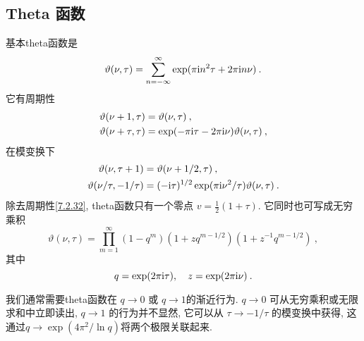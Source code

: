 \subsection*{Theta 函数}
基本theta函数是
\begin{equation}
	\vartheta(\nu, \tau)=\sum_{n=-\infty}^{\infty} \exp (\pi \mathrm{i} n^{2} \tau+2 \pi \mathrm{i} n \nu) \:. \label{7.2.31}
\end{equation}
它有周期性
\begin{subequations}  \label{7.2.32}
\begin{align}
\vartheta(\nu+1, \tau) &= \vartheta(\nu, \tau) \:, \label{7.2.32a}  \\
\vartheta(\nu+\tau, \tau) &= \exp (-\pi \mathrm{i} \tau-2 \pi \mathrm{i} \nu) \vartheta(\nu, \tau) \:, \label{7.2.32b} 
\end{align}
\end{subequations}
在模变换下
\begin{subequations} \label{7.2.33}
\begin{align}
\vartheta(\nu, \tau+1) &= \vartheta(\nu + 1/2, \tau) \:, \label{7.2.33a} \\
\vartheta(\nu/\tau, -1/\tau) &=(-\mathrm{i} \tau)^{1 / 2} \exp (\pi \mathrm{i} \nu^{2} / \tau) \vartheta(\nu, \tau) \:. \label{7.2.33b}
\end{align}
\end{subequations}
除去周期性\eqref{7.2.32},  theta函数只有一个零点 $v=\frac{1}{2}(1+\tau)$. 它同时也可写成无穷乘积
\begin{equation}
	\vartheta(\nu, \tau)=\prod_{m=1}^{\infty}(1-q^{m})(1+z q^{m-1 / 2})(1+z^{-1} q^{m-1 / 2}) \:, \label{7.2.34}
\end{equation}
其中
\begin{equation}
	q=\exp (2 \pi \mathrm{i} \tau), \quad z=\exp (2 \pi \mathrm{i}\nu) \:. \label{7.2.35}
\end{equation}

我们通常需要theta函数在 $q \rightarrow 0$ 或 $q \rightarrow 1$的渐近行为.  $q \rightarrow 0$ 可从无穷乘积或无限求和中立即读出,  $q \rightarrow 1$ 的行为并不显然, 它可以从 $\tau \rightarrow-1 / \tau$ 的模变换中获得, 这通过$q \rightarrow \exp \left(4 \pi^{2} / \ln q\right)$将两个极限关联起来.

